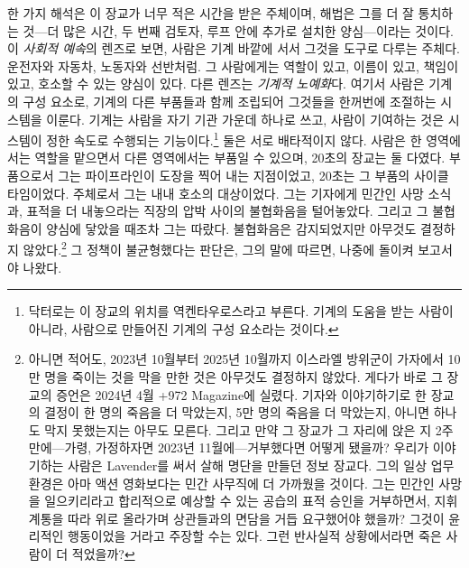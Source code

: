 한 가지 해석은 이 장교가 너무 적은 시간을 받은 주체이며, 해법은 그를 더 잘 통치하는 것—더 많은 시간, 두 번째 검토자, 루프 안에 추가로 설치한 양심—이라는 것이다. 이 \emph{사회적 예속}의 렌즈로 보면, 사람은 기계 바깥에 서서 그것을 도구로 다루는 주체다. 운전자와 자동차, 노동자와 선반처럼. 그 사람에게는 역할이 있고, 이름이 있고, 책임이 있고, 호소할 수 있는 양심이 있다. 다른 렌즈는 \emph{기계적 노예화}다. 여기서 사람은 기계의 구성 요소로, 기계의 다른 부품들과 함께 조립되어 그것들을 한꺼번에 조절하는 시스템을 이룬다. 기계는 사람을 자기 기관 가운데 하나로 쓰고, 사람이 기여하는 것은 시스템이 정한 속도로 수행되는 기능이다.\footnote{닥터로는 이 장교의 위치를 역켄타우로스라고 부른다. 기계의 도움을 받는 사람이 아니라, 사람으로 만들어진 기계의 구성 요소라는 것이다\autocite{doctorow2026reversecentaur}.} 둘은 서로 배타적이지 않다. 사람은 한 영역에서는 역할을 맡으면서 다른 영역에서는 부품일 수 있으며\autocite[제13고원, “The Apparatus of Capture”: 노예화는 인간 자신이, 더 높은 통일체의 통제와 지휘 아래 그들끼리 그리고 다른 사물들과 함께 구성하는 기계의 구성 부품일 때 있고, 예속은 더 높은 통일체가 인간을 새로운 외부 대상—동물, 도구, 심지어 기계일 수도 있다—에 연결된 주체로 구성할 때 있다]{deleuze1987plateaus}, 20초의 장교는 둘 다였다. 부품으로서 그는 파이프라인이 도장을 찍어 내는 지점이었고, 20초는 그 부품의 사이클 타임이었다. 주체로서 그는 내내 호소의 대상이었다. 그는 기자에게 민간인 사망 소식과, 표적을 더 내놓으라는 직장의 압박 사이의 불협화음을 털어놓았다. 그리고 그 불협화음이 양심에 닿았을 때조차 그는 따랐다. 불협화음은 감지되었지만 아무것도 결정하지 않았다.\footnote{아니면 적어도, 2023년 10월부터 2025년 10월까지 이스라엘 방위군이 가자에서 10만 명을 죽이는 것을 막을 만한 것은 아무것도 결정하지 않았다\autocite{gomezugarte2025uncertainty,acosta2026gaza,economist2025gaza}. 게다가 바로 그 장교의 증언은 2024년 4월 +972 Magazine에 실렸다. 기자와 이야기하기로 한 장교의 결정이 한 명의 죽음을 더 막았는지, 5만 명의 죽음을 더 막았는지, 아니면 하나도 막지 못했는지는 아무도 모른다. 그리고 만약 그 장교가 그 자리에 앉은 지 2주 만에—가령, 가정하자면 2023년 11월에—거부했다면 어떻게 됐을까? 우리가 이야기하는 사람은 Lavender를 써서 살해 명단을 만들던 정보 장교다. 그의 일상 업무 환경은 아마 액션 영화보다는 민간 사무직에 더 가까웠을 것이다. 그는 민간인 사망을 일으키리라고 합리적으로 예상할 수 있는 공습의 표적 승인을 거부하면서, 지휘 계통을 따라 위로 올라가며 상관들과의 면담을 거듭 요구했어야 했을까? 그것이 윤리적인 행동이었을 거라고 주장할 수는 있다. 그런 반사실적 상황에서라면 죽은 사람이 더 적었을까?} 그 정책이 불균형했다는 판단은, 그의 말에 따르면, 나중에 돌이켜 보고서야 나왔다.

